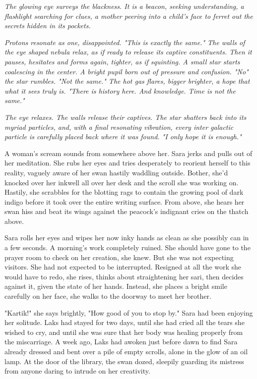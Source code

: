 \documentclass{article}
\begin{document}
\emph{The glowing eye surveys the blackness. It is a beacon, seeking understanding, a flashlight searching for clues, a mother peering into a child's face to ferret out the secrets hidden in its pockets.}

\emph{Protons resonate as one, disappointed. "This is exactly the same." The walls of the eye shaped nebula relax, as if ready to release its captive constituents. Then it pauses, hesitates and forms again, tighter, as if squinting. A small star starts coalescing in the center. A bright pupil born out of pressure and confusion. "No" the star rumbles. "Not the same." The hot gas flares, bigger brighter, a hope that what it sees truly is. "There is history here. And knowledge. Time is not the same." }

\emph{The eye relaxes. The walls release their captives. The star shatters back into its myriad particles, and, with a final resonating vibration, every inter galactic particle is carefully placed back where it was found. "I only hope it is enough."}

\vspace{5 pt}

A woman's scream sounds from somewhere above her. Sara jerks and pulls out of her meditation. She rubs her eyes and tries desperately to reorient herself to this reality, vaguely aware of her swan hastily waddling outside. Bother, she'd knocked over her inkwell all over her desk and the scroll she was working on. Hastily, she scrabbles for the blotting rags to contain the growing pool of dark indigo before it took over the entire writing surface. From above, she hears her swan hiss and beat its wings against the peacock's indignant cries on the thatch above.

Sara rolls her eyes and wipes her now inky hands as clean as she possibly can in a few seconds. A morning's work completely ruined. She should have gone to the prayer room to check on her creation, she knew. But she was not expecting visitors. She had not expected to be interrupted. Resigned at all the work she would have to redo, she rises, thinks about straightening her sari, then decides against it, given the state of her hands.  Instead, she places a bright smile carefully on her face, she walks to the doorway to meet her brother.

"Kartik!" she says brightly, "How good of you to stop by." Sara had been enjoying her solitude. Laks had stayed for two days, until she had cried all the tears she wished to cry, and until she was sure that her body was healing properly from the miscarriage. A week ago, Laks had awoken just before dawn to find Sara already dressed and bent over a pile of empty scrolls, alone in the glow of an oil lamp. At the door of the library, the swan dozed, sleepily guarding its mistress from anyone daring to intrude on her creativity. 
\end{document}
